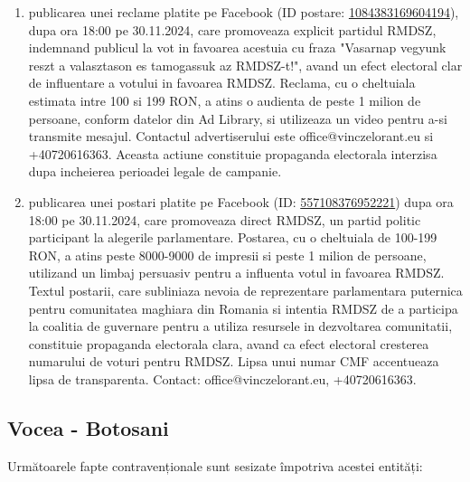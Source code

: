 \documentclass[a4paper,12pt]{article}
\begin{document}
\begin{enumerate}[leftmargin=*, label=\arabic*.)]
    \item publicarea unei reclame platite pe Facebook (ID postare: \href{https://www.facebook.com/ads/library/?id=1084383169604194}{1084383169604194}), dupa ora 18:00 pe 30.11.2024, care promoveaza explicit partidul RMDSZ, indemnand publicul la vot in favoarea acestuia cu fraza "Vasarnap vegyunk reszt a valasztason es tamogassuk az RMDSZ-t!", avand un efect electoral clar de influentare a votului in favoarea RMDSZ. Reclama, cu o cheltuiala estimata intre 100 si 199 RON, a atins o audienta de peste 1 milion de persoane, conform datelor din Ad Library, si utilizeaza un video pentru a-si transmite mesajul.  Contactul advertiserului este office@vinczelorant.eu si +40720616363.  Aceasta actiune constituie propaganda electorala interzisa dupa incheierea perioadei legale de campanie.
    \item publicarea unei postari platite pe Facebook (ID: \href{https://www.facebook.com/ads/library/?id=557108376952221}{557108376952221}) dupa ora 18:00 pe 30.11.2024, care promoveaza direct RMDSZ, un partid politic participant la alegerile parlamentare. Postarea, cu o cheltuiala de 100-199 RON, a atins peste 8000-9000 de impresii si peste 1 milion de persoane, utilizand un limbaj persuasiv pentru a influenta votul in favoarea RMDSZ.  Textul postarii, care subliniaza nevoia de reprezentare parlamentara puternica pentru comunitatea maghiara din Romania si intentia RMDSZ de a participa la coalitia de guvernare pentru a utiliza resursele in dezvoltarea comunitatii, constituie propaganda electorala clara, avand ca efect electoral cresterea numarului de voturi pentru RMDSZ.  Lipsa unui numar CMF accentueaza lipsa de transparenta.  Contact: office@vinczelorant.eu, +40720616363.
\end{enumerate}

\vspace{0.5cm}

\subsection{Vocea - Botosani}
Următoarele fapte contravenționale sunt sesizate împotriva acestei entități:
\end{document}
